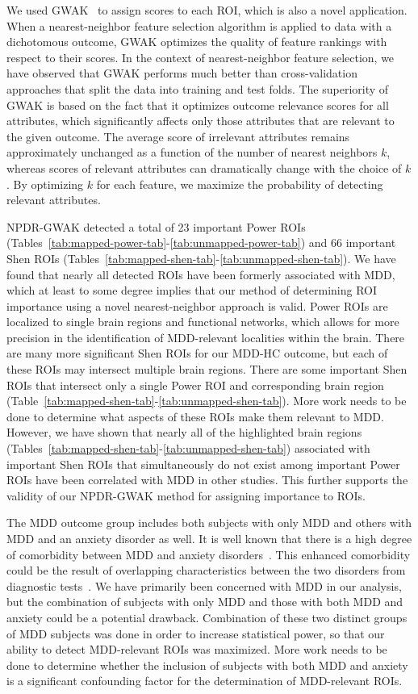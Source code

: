\documentclass[10pt,letterpaper]{article}\usepackage[]{graphicx}\usepackage[]{color}
\begin{document}
We used GWAK~\cite{mckinney13} to assign scores to each ROI, which is also a novel application. When a nearest-neighbor feature selection algorithm is applied to data with a dichotomous outcome, GWAK optimizes the quality of feature rankings with respect to their scores. In the context of nearest-neighbor feature selection, we have observed that GWAK performs much better than cross-validation approaches that split the data into training and test folds. The superiority of GWAK is based on the fact that it optimizes outcome relevance scores for all attributes, which significantly affects only those attributes that are relevant to the given outcome. The average score of irrelevant attributes remains approximately unchanged as a function of the number of nearest neighbors $k$, whereas scores of relevant attributes can dramatically change with the choice of $k$. By optimizing $k$ for each feature, we maximize the probability of detecting relevant attributes.

NPDR-GWAK detected a total of 23 important Power ROIs (Tables~\ref{tab:mapped-power-tab}-\ref{tab:unmapped-power-tab}) and 66 important Shen ROIs (Tables~\ref{tab:mapped-shen-tab}-\ref{tab:unmapped-shen-tab}). We have found that nearly all detected ROIs have been formerly associated with MDD, which at least to some degree implies that our method of determining ROI importance using a novel nearest-neighbor approach is valid. Power ROIs are localized to single brain regions and functional networks, which allows for more precision in the identification of MDD-relevant localities within the brain. There are many more significant Shen ROIs for our MDD-HC outcome, but each of these ROIs may intersect multiple brain regions. There are some important Shen ROIs that intersect only a single Power ROI and corresponding brain region (Table~\ref{tab:mapped-shen-tab}-\ref{tab:unmapped-shen-tab}). More work needs to be done to determine what aspects of these ROIs make them relevant to MDD. However, we have shown that nearly all of the highlighted brain regions (Tables~\ref{tab:mapped-shen-tab}-\ref{tab:unmapped-shen-tab}) associated with important Shen ROIs that simultaneously do not exist among important Power ROIs have been correlated with MDD in other studies. This further supports the validity of our NPDR-GWAK method for assigning importance to ROIs.

The MDD outcome group includes both subjects with only MDD and others with MDD and an anxiety disorder as well. It is well known that there is a high degree of comorbidity between MDD and anxiety disorders~\cite{zbozinek2012,hirschfeld2001,zhou2017-2}. This enhanced comorbidity could be the result of overlapping characteristics between the two disorders from diagnostic tests~\cite{zbozinek2012}. We have primarily been concerned with MDD in our analysis, but the combination of subjects with only MDD and those with both MDD and anxiety could be a potential drawback. Combination of these two distinct groups of MDD subjects was done in order to increase statistical power, so that our ability to detect MDD-relevant ROIs was maximized. More work needs to be done to determine whether the inclusion of subjects with both MDD and anxiety is a significant confounding factor for the determination of MDD-relevant ROIs.
\end{document}
